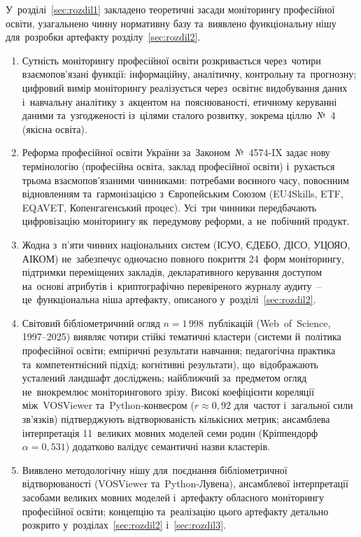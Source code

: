 У~розділі~\ref{sec:rozdil1} закладено теоретичні засади моніторингу професійної освіти, узагальнено чинну нормативну базу та~виявлено функціональну нішу для~розробки артефакту розділу~\ref{sec:rozdil2}.

\begin{enumerate}
    \item Сутність моніторингу професійної освіти розкривається через~чотири взаємопов'язані функції: інформаційну, аналітичну, контрольну та~прогнозну; цифровий вимір моніторингу реалізується через~освітнє видобування даних і~навчальну аналітику з~акцентом на~пояснюваності, етичному керуванні даними та~узгодженості із~цілями сталого розвитку, зокрема ціллю~№~4 (якісна освіта).

    \item Реформа професійної освіти України за~Законом~№~4574-IX задає нову термінологію (професійна освіта, заклад професійної освіти) і~рухається трьома взаємопов'язаними чинниками: потребами воєнного часу, повоєнним відновленням та~гармонізацією з~Європейським Союзом (EU4Skills, ETF, EQAVET, Копенгагенський процес). Усі~три чинники передбачають цифровізацію моніторингу як~передумову реформи, а~не~побічний продукт.

    \item Жодна з~п'яти чинних національних систем (ІСУО, ЄДЕБО, ДІСО, УЦОЯО, АІКОМ) не~забезпечує одночасно повного покриття 24~форм моніторингу, підтримки переміщених закладів, декларативного керування доступом на~основі атрибутів і~криптографічно перевіреного журналу аудиту~-- це~функціональна ніша артефакту, описаного у~розділі~\ref{sec:rozdil2}.

    \item Світовий бібліометричний огляд $n=1\,998$~публікацій (Web~of~Science, 1997--2025) виявляє чотири стійкі тематичні кластери (системи й~політика професійної освіти; емпіричні результати навчання; педагогічна практика та~компетентнісний підхід; когнітивні результати), що~відображають усталений ландшафт досліджень; найближчий за~предметом огляд не~виокремлює моніторингового зрізу. Високі коефіцієнти кореляції між~VOSViewer та~Python-конвеєром ($r\approx 0{,}92$ для~частот і~загальної сили зв'язків) підтверджують відтворюваність кількісних метрик; ансамблева інтерпретація 11~великих мовних моделей семи родин (Кріппендорф $\alpha=0{,}531$) додатково валідує семантичні назви кластерів.

    \item Виявлено методологічну нішу для~поєднання бібліометричної відтворюваності (VOSViewer та~Python-Лувена), ансамблевої інтерпретації засобами великих мовних моделей і~артефакту обласного моніторингу професійної освіти; концепцію та~реалізацію цього артефакту детально розкрито у~розділах~\ref{sec:rozdil2} і~\ref{sec:rozdil3}.
\end{enumerate}
